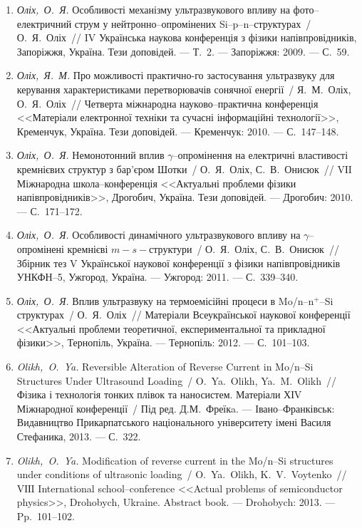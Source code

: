 \begin{enumerate}[label=\arabic*.,leftmargin=1cm,itemindent=0cm]
\item
\emph{Оліх,~О.~Я.} Особливості механізму
  ультразвукового впливу на
  фото--електричний струм у
  нейтронно--опромінених {S}i--p--n--структурах~/
  О.~Я.~Оліх~// {IV} {У}країнська наукова
  конференція з фізики напівпровідників,
  {З}апоріжжя, {У}країна. Тези доповідей. ---
  Т.~2. ---
  {З}апоріжжя: 2009. ---
  {С.}~59.

\item
\emph{Оліх,~Я.~М.} Про можливості практично-го
  застосування ультразвуку для керування
  характеристиками перетворювачів
  сонячної енергії~/ Я.~М.~Оліх, О.~Я.~Оліх~//
  Четверта міжнародна науково--практична
  конференція <<Матеріали електронної
  техніки та сучасні інформаційні
  технології>>, {К}ременчук, {У}країна. Тези
  доповідей. ---
  {К}ременчук: 2010. ---
  {С.}~147--148.

\item
\emph{Оліх,~О.~Я.} Немонотонний вплив
  $\gamma$--опромінення на електричні
  властивості кремнієвих структур з
  бар’єром {Ш}отки~/ О.~Я.~Оліх, С.~В.~Онисюк~//
  {VІI} {М}іжнародна школа--конференція
  <<Актуальні проблеми фізики
  напівпровідників>>, {Д}рогобич, {У}країна.
  Тези доповідей. ---
  Дрогобич: 2010. ---
  {С.}~171--172.

\item
\emph{Оліх,~О.~Я.} Особливості динамічного
  ультразвукового впливу на
  $\gamma$--опромінені кремнієві $m-s-$структури~/
  О.~Я.~Оліх, С.~В.~Онисюк~// Збірник тез {V}
  {У}країнської наукової конференції з
  фізики напівпровідників {УНКФН}--5,
  Ужгород, {У}країна. ---
  Ужгород: 2011. ---
  {С.}~339--340.

\item
\emph{Оліх,~О.~Я.} Вплив ультразвуку на
  термоемісійні процеси в Mo/n--n$^+$--Si
  структурах~/ О.~Я.~Оліх~// Матеріали
  {В}сеукраїнської наукової конференції
  <<Актуальні проблеми теоретичної,
  експериментальної та прикладної фізики>>,
  {Т}ернопіль, {У}країна. ---
  Тернопіль: 2012. ---
  {С.}~101--103.

\item
\emph{Olikh,~O.~Ya.} Reversible Alteration of Reverse Current in Mo/n--Si
  Structures Under Ultrasound Loading~/ O.~Ya.~Olikh, Ya.~M.~Olikh~//
  Фізика і технологія тонких плівок та
  наносистем. {М}атеріали {ХІV} Міжнародної
  конференції~/ {Під ред. }Д.М.~Фреїкa. ---
  Івано--Франківськ: Видавництво
  {П}рикарпатського національного
  університету імені {В}асиля {С}тефаника,
  2013. ---
  {С.}~322.

\item
\emph{Olikh,~O.~Ya.} Modification of reverse current in the Mo/n--Si
  structures under conditions of ultrasonic loading~/ O.~Ya.~Olikh,
  K.~V.~Voytenko~// {VІІI} {I}nternational school--conference <<Actual
  problems of semiconductor physics>>, {D}rohobych, {U}kraine. Abstract book.
  ---
  Drohobych: 2013. ---
  Pp.~101--102.


\end{enumerate}
